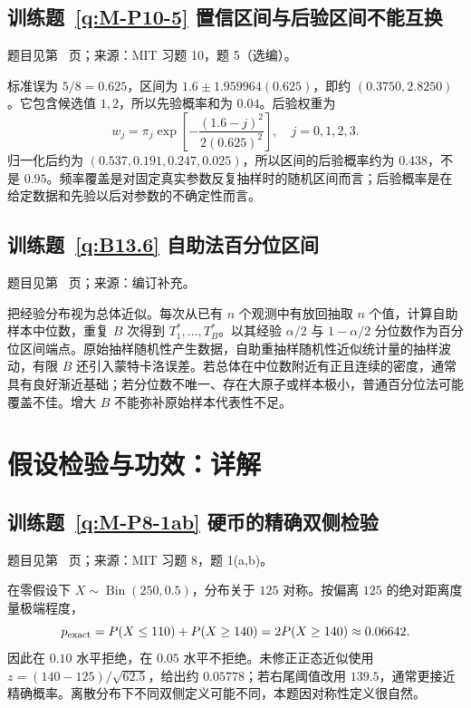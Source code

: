 \documentclass[UTF8,12pt,a4paper,fontset=fandol]{ctexbook}
\begin{document}
\subsection*{训练题~\ref{q:M-P10-5} 置信区间与后验区间不能互换}\label{a:M-P10-5}{\small 题目见第~\pageref{q:M-P10-5} 页；来源：MIT 习题 10，题 5（选编）。}
\begin{solve}标准误为 $5/8=0.625$，区间为 $1.6\pm1.959964(0.625)$，即约 $(0.3750,2.8250)$。它包含候选值 $1,2$，所以先验概率和为 $0.04$。后验权重为\[w_j=\pi_j\exp\left[-\frac{(1.6-j)^2}{2(0.625)^2}\right],\quad j=0,1,2,3.\]归一化后约为 $(0.537,0.191,0.247,0.025)$，所以区间的后验概率约为 $0.438$，不是 $0.95$。频率覆盖是对固定真实参数反复抽样时的随机区间而言；后验概率是在给定数据和先验以后对参数的不确定性而言。\end{solve}

\subsection*{训练题~\ref{q:B13.6} 自助法百分位区间}\label{a:B13.6}{\small 题目见第~\pageref{q:B13.6} 页；来源：编订补充。}
\begin{solve}把经验分布视为总体近似。每次从已有 $n$ 个观测中有放回抽取 $n$ 个值，计算自助样本中位数，重复 $B$ 次得到 $T_1^*,\ldots,T_B^*$。以其经验 $\alpha/2$ 与 $1-\alpha/2$ 分位数作为百分位区间端点。原始抽样随机性产生数据，自助重抽样随机性近似统计量的抽样波动，有限 $B$ 还引入蒙特卡洛误差。若总体在中位数附近有正且连续的密度，通常具有良好渐近基础；若分位数不唯一、存在大原子或样本极小，普通百分位法可能覆盖不佳。增大 $B$ 不能弥补原始样本代表性不足。\end{solve}

\clearpage\section*{假设检验与功效：详解}

\subsection*{训练题~\ref{q:M-P8-1ab} 硬币的精确双侧检验}\label{a:M-P8-1ab}{\small 题目见第~\pageref{q:M-P8-1ab} 页；来源：MIT 习题 8，题 1(a,b)。}
\begin{solve}在零假设下 $X\sim\operatorname{Bin}(250,0.5)$，分布关于 $125$ 对称。按偏离 $125$ 的绝对距离度量极端程度，\[p_{\rm exact}=P(X\le110)+P(X\ge140)=2P(X\ge140)\approx0.06642.\]因此在 $0.10$ 水平拒绝，在 $0.05$ 水平不拒绝。未修正正态近似使用 $z=(140-125)/\sqrt{62.5}$，给出约 $0.05778$；若右尾阈值改用 $139.5$，通常更接近精确概率。离散分布下不同双侧定义可能不同，本题因对称性定义很自然。\end{solve}
\end{document}
